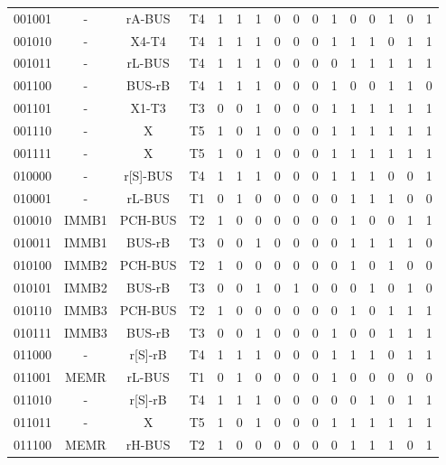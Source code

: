 \documentclass[10pt]{book}
\begin{document}
\begin{longtable}{|c|c|c|c||c|c|c||c|c|c||c|c|c|c|c|c|}
001001 & - 		& rA-BUS		& T4   & 1 & 1 & 1  & 0 & 0 & 0  & 1 & 0 & 0 & 1 & 0 & 1 \\
001010 & - 		& X4-T4		& T4   & 1 & 1 & 1  & 0 & 0 & 0  & 1 & 1 & 1 & 0 & 1 & 1 \\
001011 & - 		& rL-BUS		& T4   & 1 & 1 & 1  & 0 & 0 & 0  & 0 & 1 & 1 & 1 & 1 & 1 \\
001100 & - 		& BUS-rB 		& T4   & 1 & 1 & 1  & 0 & 0 & 0  & 1 & 0 & 0 & 1 & 1 & 0 \\
001101 & - 		& X1-T3		& T3   & 0 & 0 & 1  & 0 & 0 & 0  & 1 & 1 & 1 & 1 & 1 & 1 \\
001110 & - 		& X 			& T5   & 1 & 0 & 1  & 0 & 0 & 0  & 1 & 1 & 1 & 1 & 1 & 1 \\
001111 & - 		& X 			& T5   & 1 & 0 & 1  & 0 & 0 & 0  & 1 & 1 & 1 & 1 & 1 & 1 \\
\hline
010000 & - 		& r[S]-BUS		& T4   & 1 & 1 & 1  & 0 & 0 & 0  & 1 & 1 & 1 & 0 & 0 & 1 \\
010001 & - 		& rL-BUS		& T1   & 0 & 1 & 0  & 0 & 0 & 0  & 0 & 1 & 1 & 1 & 0 & 0 \\
010010 & IMMB1		& PCH-BUS		& T2   & 1 & 0 & 0  & 0 & 0 & 0  & 0 & 1 & 0 & 0 & 1 & 1 \\
010011 & IMMB1		& BUS-rB 		& T3   & 0 & 0 & 1  & 0 & 0 & 0  & 0 & 1 & 1 & 1 & 1 & 0 \\
010100 & IMMB2		& PCH-BUS		& T2   & 1 & 0 & 0  & 0 & 0 & 0  & 0 & 1 & 0 & 1 & 0 & 0 \\
010101 & IMMB2		& BUS-rB 		& T3   & 0 & 0 & 1  & 0 & 1 & 0  & 0 & 0 & 1 & 0 & 1 & 0 \\
010110 & IMMB3		& PCH-BUS		& T2   & 1 & 0 & 0  & 0 & 0 & 0  & 0 & 1 & 0 & 1 & 1 & 1 \\
010111 & IMMB3		& BUS-rB 		& T3   & 0 & 0 & 1  & 0 & 0 & 0  & 1 & 0 & 0 & 1 & 1 & 1 \\
\hline
011000 & - 		& r[S]-rB 		& T4   & 1 & 1 & 1  & 0 & 0 & 0  & 1 & 1 & 1 & 0 & 1 & 1 \\
011001 & MEMR 		& rL-BUS		& T1   & 0 & 1 & 0  & 0 & 0 & 0  & 1 & 0 & 0 & 0 & 0 & 0 \\
011010 & - 		& r[S]-rB 		& T4   & 1 & 1 & 1  & 0 & 0 & 0  & 0 & 0 & 1 & 0 & 1 & 1 \\
011011 & - 		& X 			& T5   & 1 & 0 & 1  & 0 & 0 & 0  & 1 & 1 & 1 & 1 & 1 & 1 \\
011100 & MEMR		& rH-BUS		& T2   & 1 & 0 & 0  & 0 & 0 & 0  & 0 & 1 & 1 & 1 & 0 & 1 \\

\end{longtable}
\end{document}
